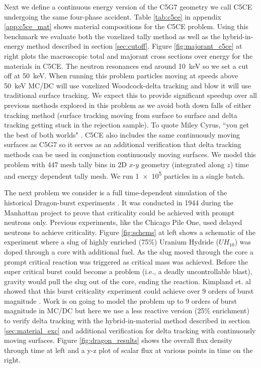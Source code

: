 Next we define a continuous energy version of the C5G7 geometry we call C5CE undergoing the same four-phase accident.
Table \ref{tab:c5ce} in appendix \ref{app:c5ce_mat} shows material compositions for the C5CE problem.
Using this benchmark we evaluate both the voxelized tally method as well as the hybrid-in-energy method described in section \ref{sec:cutoff}.
Figure \ref{fig:majorant_c5ce} at right plots the macroscopic total and majorant cross sections over energy for the materials in C5CE.
The neutron resonances end around \SI{10}{\kilo\electronvolt} so we set a cut off at \SI{50}{\kilo\electronvolt}.
When running this problem particles moving at speeds above \SI{50}{\kilo\electronvolt} MC/DC will use voxelized Woodcock-delta tracking and blow it will use traditional surface tracking.
We expect this to provide significant speedup over all previous methods explored in this problem as we avoid both down falls of either tracking method (surface tracking moving from surface to surface and delta tracking getting stuck in the rejection sample). 
To quote Miley Cyrus, ``you get the best of both worlds" \cite{cyrus_best_2005}.
C5CE also includes the same continuously moving surfaces as C5G7 so it serves as an additional verification that delta tracking methods can be used in conjunction continuously moving surfaces.
We model this problem with \num{447} mesh tally bins in 2D $x$-$y$ geometry (integrated along $z$) time and energy dependent tally mesh.
We run \num{1e5} particles in a single batch.

The next problem we consider is a full time-dependent simulation of the historical Dragon-burst experiments \cite{kimpland2021dragon}.
It was conducted in 1944 during the Manhattan project to prove that criticality could be achieved with prompt neutrons only.
Previous experiments, like the Chicago Pile One, used delayed neutrons to achieve criticality.
Figure \ref{fig:schems} at left shows a schematic of the experiment where a slug of highly enriched (75\%) Uranium Hydride ($UH_{10}$) was doped through a core with additional fuel.
As the slug moved through the core a prompt critical reaction was triggered as critical mass was achieved.
Before the super critical burst could become a problem (i.e., a deadly uncontrollable blast), gravity would pull the slug out of the core, ending the reaction.
Kimpland et. al showed that this burst criticality experiment could achieve over 9 orders of burst magnitude \cite{kimpland2021dragon}.
Work is on going to model the problem up to 9 orders of burst magnitude in MC/DC but here we use a less reactive version (25\% enrichment) to verify delta tracking with the hybrid-in-material method described in section \ref{sec:material_exc} and additional verification for delta tracking with continuously moving surfaces.
Figure \ref{fig:dragon_results} shows the overall flux density through time at left and a y-z plot of scalar flux at various points in time on the right.

